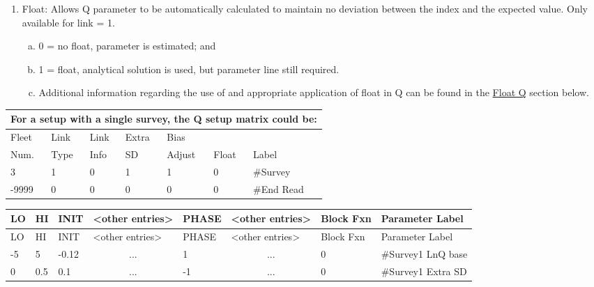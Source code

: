\begin{enumerate}
	\item Float: Allows Q parameter to be automatically calculated to maintain no deviation between the index and the expected value. Only available for link = 1.
	\begin{enumerate}[(a)]
		\item 0 = no float, parameter is estimated; and
		\item 1 = float, analytical solution is used, but parameter line still required.
		\item Additional information regarding the use of and appropriate application of float in Q can be found in the \hyperlink{FloatQ}{Float Q} section below.
	\end{enumerate}
\end{enumerate}

\begin{longtable}{p{2cm} p{2cm} p{2cm} p{2cm} p{2cm} p{1.3cm} p{2.3cm}}
	\multicolumn{7}{l}{For a setup with a single survey, the Q setup matrix could be:} \\
	\hline
	Fleet \Tstrut & Link & Link & Extra & Bias   & & \\
	Num.          & Type & Info & SD    & Adjust & Float & Label \Bstrut\\
	\hline
	3 & 1 & 0 & 1 & 1 & 0 & \#Survey \Tstrut\\
	-9999 & 0 & 0 & 0 & 0 & 0 & \#End Read \Bstrut\\
	\hline
\end{longtable}


\begin{longtable}{p{1cm} p{1cm} p{1cm} p{1.5cm} p{1.5cm} p{1.5cm} p{1.75cm} p{4cm}}
	\hline
	LO \Tstrut & HI & INIT & <other entries> & PHASE & <other entries> & Block Fxn & Parameter Label \Bstrut\\
	\hline
	\endfirsthead

	\hline
	LO \Tstrut & HI & INIT & <other entries> & PHASE & <other entries> & Block Fxn & Parameter Label \Bstrut\\
	\hline
	\endhead

	\hline
	\endfoot
	\endlastfoot

	-5 & 5 & -0.12 & \multicolumn{1}{c}{...} &  1 & \multicolumn{1}{c}{...} & 0 & \#Survey1 LnQ base \Tstrut\\
	 0 & 0.5 & 0.1 & \multicolumn{1}{c}{...} & -1 & \multicolumn{1}{c}{...} & 0 & \#Survey1 Extra SD \Bstrut\\
	\hline
\end{longtable}

